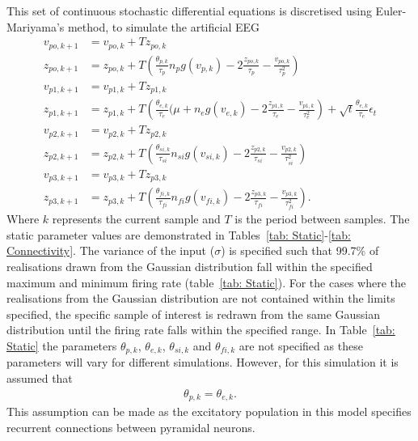 This set of continuous stochastic differential equations is discretised using Euler-Mariyama's method, to simulate the artificial EEG \begin{align}
v_{po,k+1}&=v_{po,k}+Tz_{po,k}\\
z_{po,k+1}&=z_{po,k}+T\left(\frac{\theta_{p,k}}{\tau_{p}}n_{p}g(v_{p,k})-2\frac{z_{po,k}}{\tau_{p}}-\frac{v_{po,k}}{\tau_{p}^{2}}\right)\\
v_{p1,k+1}&=v_{p1,k}+Tz_{p1,k}\\
z_{p1,k+1}&=z_{p1,k}+T\left(\frac{\theta_{e,k}}{\tau_{e}}(\mu +n_{e}g(v_{e,k})-2\frac{z_{p1,k}}{\tau_{e}}-\frac{v_{p1,k}}{\tau_{e}^{2}}\right) + \sqrt{t}\frac{\theta_{e,k}}{\tau_{e}}\epsilon_{t}\\
v_{p2,k+1}&=v_{p2,k}+Tz_{p2,k}\\
z_{p2,k+1}&=z_{p2,k}+T\left(\frac{\theta_{si,k}}{\tau_{si}}n_{si}g(v_{si,k})-2\frac{z_{p2,k}}{\tau_{si}}-\frac{v_{p2,k}}{\tau_{si}^{2}}\right)\\
v_{p3,k+1}&=v_{p3,k}+Tz_{p3,k}\\
z_{p3,k+1}&=z_{p3,k}+T\left(\frac{\theta_{fi,k}}{\tau_{fi}}n_{fi}g(v_{fi,k})-2\frac{z_{p3,k}}{\tau_{fi}}-\frac{v_{p3,k}}{\tau_{fi}^{2}}\right).
\end{align} Where $k$ represents the current sample and $T$ is the period between samples. The static parameter values are demonstrated in  Tables~\ref{tab: Static}-\ref{tab: Connectivity}. The variance of the input ($\sigma$) is specified such that 99.7\% of realisations drawn from the Gaussian distribution fall within the specified maximum and minimum firing rate (table~\ref{tab: Static}). For the cases where the realisations from the Gaussian distribution are not contained within the limits specified, the specific sample of interest is redrawn from the same Gaussian distribution until the firing rate falls within the specified range. In Table~\ref{tab: Static} the parameters $\theta_{p,k}$, $\theta_{e,k}$, $\theta_{si,k}$ and $\theta_{fi,k}$ are not specified as these parameters will vary for different simulations. However, for this simulation it is assumed that \begin{align}
\theta_{p,k} = \theta_{e,k}.
\end{align} This assumption can be made as the excitatory population in this model specifies recurrent connections between pyramidal neurons.  
\singlespacing
\small
